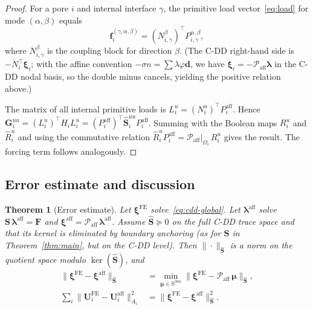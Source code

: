 \documentclass[11pt,a4paper]{article}
\newtheorem{theorem}[lemma]{Theorem}
\newcommand{\R}{\mathbb{R}}
\newcommand{\pore}[1]{\Omega_{#1}}
\newcommand{\trac}{\bm{\lambda}}
\newcommand{\DtN}{\mathbf{G}}
\newcommand{\Schur}{\mathbf{S}}
\newcommand{\loadvec}{\bm{f}}
\newcommand{\respvel}{\mathbf{U}}
\begin{document}
\begin{proof}
  For a pore $i$ and internal interface $\gamma$, the primitive load
  vector~\eqref{eq:load} for mode $(\alpha,\beta)$ equals
  \[
    \loadvec_i^{(\gamma,\alpha,\beta)}
    = (N_{i,\gamma}^\beta)^\top P_{i,\gamma}^{\alpha,\beta},
  \]
  where $N_{i,\gamma}^\beta$ is the coupling block for direction $\beta$.
  (The C-DD right-hand side is $-N_i^\top\bm{\xi}_i$; with the
  affine convention $-\sigma n = \sum\lambda\varphi\bm{d}$, we have
  $\bm{\xi}_i = -\mathcal{P}_{\text{aff}}\trac$
  in the C-DD nodal basis, so the double minus cancels, yielding the
  positive relation above.)

  The matrix of all internal primitive loads is
  $L_i^u = (N_i^u)^\top P_i^{\text{aff}}$.
  Hence $\DtN_i^{uu} = (L_i^u)^\top H_i L_i^u
   = (P_i^{\text{aff}})^\top \widehat{\Schur}_i^{uu} P_i^{\text{aff}}$.
  Summing with the Boolean maps $R_i^u$ and $\widehat{R}_i^u$ and using
  the commutative relation
  $\widehat{R}_i^u P_i^{\text{aff}}
   = \mathcal{P}_{\text{aff}}|_{\pore{i}}\, R_i^u$
  gives the result.  The forcing term follows analogously.
\end{proof}

\subsection{Error estimate and discussion}

\begin{theorem}[Error estimate]\label{thm:error}
  Let $\bm{\xi}^{\text{FE}}$ solve~\eqref{eq:cdd-global}.
  Let $\trac^{\text{aff}}$ solve $\Schur\,\trac^{\text{aff}} = \bm{F}$ and
  $\bm{\xi}^{\text{aff}} = \mathcal{P}_{\text{aff}}\,\trac^{\text{aff}}$.
  Assume $\widehat{\Schur} \succeq 0$ on the full C-DD trace space and
  that its kernel is eliminated by boundary anchoring (as for $\Schur$
  in Theorem~\ref{thm:main}, but on the C-DD level).
  Then $\|\cdot\|_{\widehat{\Schur}}$ is a norm on the quotient space
  modulo $\ker(\widehat{\Schur})$, and
  \begin{align}
    \|\bm{\xi}^{\text{FE}} - \bm{\xi}^{\text{aff}}\|_{\widehat{\Schur}}
    &= \min_{\bm{\mu}\in\R^{9m}}
       \|\bm{\xi}^{\text{FE}}
         - \mathcal{P}_{\text{aff}}\,\bm{\mu}\|_{\widehat{\Schur}},\label{eq:err-est}\\
    \sum_i \|\respvel_i^{\text{FE}}
           - \respvel_i^{\text{aff}}\|_{A_i}^2
    &= \|\bm{\xi}^{\text{FE}}
       - \bm{\xi}^{\text{aff}}\|_{\widehat{\Schur}}^2.\label{eq:vel-err}
  \end{align}
\end{theorem}
\end{document}
